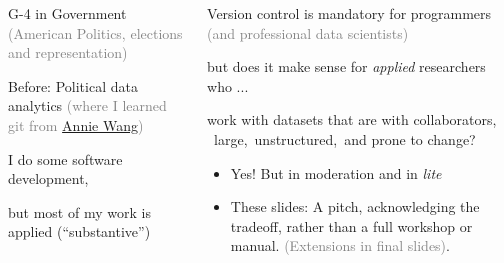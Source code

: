 \documentclass[ignorenonframetext, 10pt, aspectratio=169]{beamer}
\begin{document}
\begin{frame}{}

\begin{columns}[T]

\begin{column}{0.4\textwidth}
\begin{wideitemize}
\item G-4 in Government \textcolor{gray}{(American Politics, elections and representation)}
\item Before: Political data analytics \textcolor{gray}{(where I learned git from \href{https://anniejw.com/}{Annie Wang})}
\end{wideitemize}\pause
\bigskip
\begin{wideitemize}
\item I do some software development,
\item but most of my work is applied (``substantive'')
\end{wideitemize}
\end{column}\pause
\begin{column}{0.6\textwidth}
\begin{wideitemize}
\item Version control is mandatory for programmers \textcolor{gray}{(and professional data scientists)}\pause
\item but does it make sense for \emph{applied} researchers who ...
\item work with datasets that are \pause \alert{with collaborators}, ~\alert{large},\pause ~\alert{unstructured},\pause ~and \alert{prone to change}?
\end{wideitemize}\pause

\bigskip
{}

\begin{tcolorbox}
\begin{itemize}
\item[{}] Yes! But in moderation and in \emph{lite}
\item[{}] These slides: A pitch, acknowledging the tradeoff, \pause rather than a full workshop or manual. \textcolor{gray}{(Extensions in final slides)}.
\end{itemize}
\end{tcolorbox}
\end{column}
\end{columns}
\end{frame}
\end{document}
